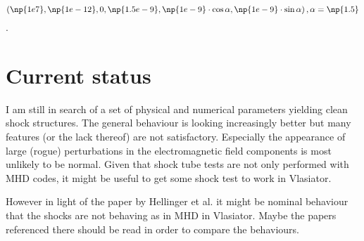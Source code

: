 \documentclass[a4paper,10pt]{scrartcl}
\begin{document}
$$
\left(\np{1e7}, \np{1e-12}, 0, \np{1.5e-9}, \np{1e-9}\cdot\cos \alpha, \np{1e-9}\cdot\sin \alpha\right), \alpha = \np{1.5}
$$.


\section{Current status}
I am still in search of a set of physical and numerical parameters yielding clean shock structures. The general behaviour is looking increasingly better but many features (or the lack thereof) are not satisfactory. Especially the appearance of large (rogue) perturbations in the electromagnetic field components is most unlikely to be normal. Given that shock tube tests are not only performed with MHD codes, it might be useful to get some shock test to work in Vlasiator.

However in light of the paper by Hellinger et al. it might be nominal behaviour that the shocks are not behaving as in MHD in Vlasiator. Maybe the papers referenced there should be read in order to compare the behaviours.
\end{document}
